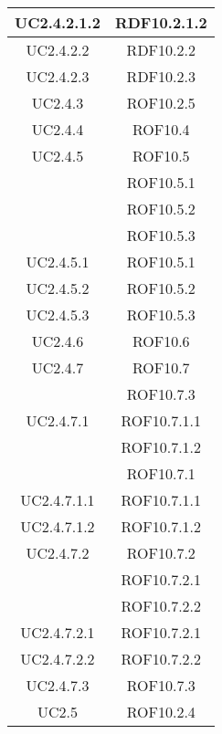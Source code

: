 \begin{longtable}{|c|c|}
\midrule
UC2.4.2.1.2
& RDF10.2.1.2\\

\midrule
UC2.4.2.2
& RDF10.2.2\\

\midrule
UC2.4.2.3
& RDF10.2.3\\

\midrule
UC2.4.3
& ROF10.2.5\\

\midrule
UC2.4.4
& ROF10.4\\

\midrule
UC2.4.5
& ROF10.5\\
& ROF10.5.1\\
& ROF10.5.2\\
& ROF10.5.3\\

\midrule
UC2.4.5.1
& ROF10.5.1\\

\midrule
UC2.4.5.2
& ROF10.5.2\\

\midrule
UC2.4.5.3
& ROF10.5.3\\

\midrule
UC2.4.6
& ROF10.6\\

\midrule
UC2.4.7
& ROF10.7\\
& ROF10.7.3\\

\midrule
UC2.4.7.1
& ROF10.7.1.1\\
& ROF10.7.1.2\\
& ROF10.7.1\\

\midrule
UC2.4.7.1.1
& ROF10.7.1.1\\

\midrule
UC2.4.7.1.2
& ROF10.7.1.2\\

\midrule
UC2.4.7.2
& ROF10.7.2\\
& ROF10.7.2.1\\
& ROF10.7.2.2\\

\midrule
UC2.4.7.2.1
& ROF10.7.2.1\\

\midrule
UC2.4.7.2.2
& ROF10.7.2.2\\

\midrule
UC2.4.7.3
& ROF10.7.3\\

\midrule
UC2.5
& ROF10.2.4\\


\end{longtable}
